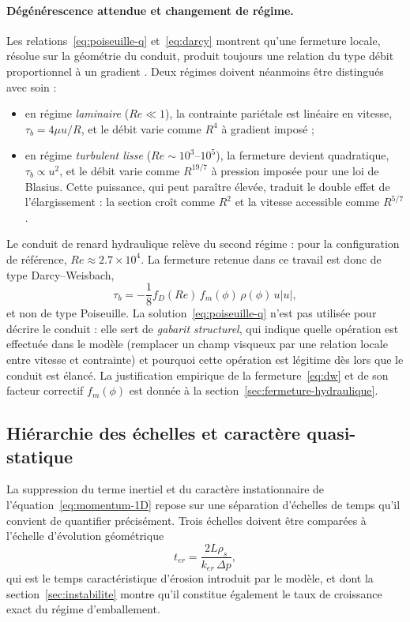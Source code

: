 \documentclass[11pt,a4paper]{report}
\newcommand{\ter}{{t_{er}}}
\begin{document}
\paragraph{Dégénérescence attendue et changement de régime.} Les relations~\eqref{eq:poiseuille-q}
et~\eqref{eq:darcy} montrent qu'une fermeture locale, résolue sur la géométrie du conduit, produit
toujours une relation du type \og débit proportionnel à un gradient \fg{}. Deux régimes doivent
néanmoins être distingués avec soin :
\begin{itemize}
  \item en régime \emph{laminaire} (\(Re \ll 1\)), la contrainte pariétale est linéaire en vitesse,
        \(\tau_b = 4\mu u/R\), et le débit varie comme \(R^4\) à gradient imposé ;
  \item en régime \emph{turbulent lisse} (\(Re \sim 10^3\)--\(10^5\)), la fermeture devient quadratique,
        \(\tau_b \propto u^2\), et le débit varie comme \(R^{19/7}\) à pression imposée pour une loi de
        Blasius. Cette puissance, qui peut paraître élevée, traduit le double effet de l'élargissement :
        la section croît comme \(R^2\) et la vitesse accessible comme \(R^{5/7}\).
\end{itemize}
Le conduit de renard hydraulique relève du second régime : pour la configuration de référence,
\(Re \approx 2.7\times10^4\). La fermeture retenue dans ce travail est donc de type Darcy--Weisbach,
\begin{equation}
\tau_b = -\frac{1}{8}f_D(Re)\,f_m(\phi)\,\rho(\phi)\,u|u|,
\label{eq:dw}
\end{equation}
et non de type Poiseuille. La solution~\eqref{eq:poiseuille-q} n'est pas utilisée pour décrire le
conduit : elle sert de \emph{gabarit structurel}, qui indique quelle opération est effectuée dans le
modèle (remplacer un champ visqueux par une relation locale entre vitesse et contrainte) et pourquoi
cette opération est légitime dès lors que le conduit est élancé. La justification empirique de la
fermeture~\eqref{eq:dw} et de son facteur correctif \(f_m(\phi)\) est donnée à la
section~\ref{sec:fermeture-hydraulique}.

\subsection{Hiérarchie des échelles et caractère quasi-statique}
\label{sec:echelles}

La suppression du terme inertiel et du caractère instationnaire de l'équation~\eqref{eq:momentum-1D}
repose sur une séparation d'échelles de temps qu'il convient de quantifier précisément. Trois échelles
doivent être comparées à l'échelle d'évolution géométrique
\begin{equation}
\ter = \frac{2L\rho_s}{k_{er}\,\Delta p},
\label{eq:ter}
\end{equation}
qui est le temps caractéristique d'érosion introduit par le modèle, et dont la
section~\ref{sec:instabilite} montre qu'il constitue également le taux de croissance exact du régime
d'emballement.
\end{document}

